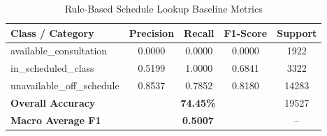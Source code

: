 \begin{table}[htbp]
\centering
\caption{Rule-Based Schedule Lookup Baseline Metrics}
\begin{tabular}{lcccc}
\hline
\textbf{Class / Category} & \textbf{Precision} & \textbf{Recall} & \textbf{F1-Score} & \textbf{Support} \\
\hline
available\_consultation & 0.0000 & 0.0000 & 0.0000 & 1922 \\
in\_scheduled\_class & 0.5199 & 1.0000 & 0.6841 & 3322 \\
unavailable\_off\_schedule & 0.8537 & 0.7852 & 0.8180 & 14283 \\
\hline
\textbf{Overall Accuracy} & \multicolumn{3}{c}{\textbf{74.45\%}} & 19527 \\
\textbf{Macro Average F1} & \multicolumn{3}{c}{\textbf{0.5007}} & -- \\
\hline
\end{tabular}
\label{tab:model_performance}
\end{table}